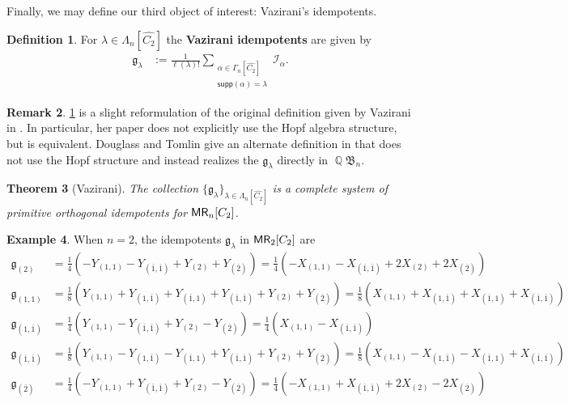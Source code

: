 \documentclass[11pt, oneside, reqno]{amsart}
\newtheorem{theorem}{Theorem}[section]
\theoremstyle{definition}
\newtheorem{definition}[theorem]{Definition}
\newtheorem{example}[theorem]{Example}
\newtheorem{remark}[theorem]{Remark}
\numberwithin{equation}{section}
\DeclareMathOperator{\Q}{\mathbb{Q}}
\newcommand{\defn}[1]{{\color{RoyalBlue}\bf#1}}
\def \MR {{\sf{MR}}}
\def \frakg{{\mathfrak{g}}}
\def \ol{\overline}
\def \I {{\mathcal{I}}}
\def \ztwo {{C_2}}
\def \ztwodual {{\widehat{\ztwo}}}
\def \ztwocompositiondual{{\Gamma_n[\ztwodual]}}
\def \ztwopartitiondual{{\Lambda_n[\ztwodual]}}
\def \supp{\mathsf{supp}}
\begin{document}
Finally, we may define our third object of interest:  Vazirani's idempotents.
\begin{definition} \label{def:vazidem}
For $\lambda \in \ztwopartitiondual$ the \defn{Vazirani idempotents} are given by 
\begin{align*}
     \frakg_{\lambda} &:= \frac{1}{\ell( \lambda) !} \sum_{\substack{\alpha \in \ztwocompositiondual\\ \supp(\alpha) = \lambda}} \I_\alpha.
    \end{align*}
\end{definition}
\begin{remark}
\cref{def:vazidem} is a slight reformulation of the original definition given by Vazirani in \cite{vazirani}. In particular, her paper does not explicitly use the Hopf algebra structure, but is equivalent. Douglass and Tomlin give an alternate definition in \cite{DouTom2018decomposition} that does not use the Hopf structure and instead realizes the $\frakg_{\lambda}$ directly in $\Q \mathfrak{B}_n $.
\end{remark}
\begin{theorem}[Vazirani]
    The collection $\{\frakg_{\lambda}\}_{\lambda \in \ztwopartitiondual}$ is a complete system of primitive orthogonal idempotents for $\MR_n[\ztwo]$.
\end{theorem}
\begin{example} 
When $n=2$, the idempotents $\frakg_{\lambda}$ in $\MR_2[\ztwo]$ are
\begin{align*}
    \frakg_{(2)} & 
        = \frac{1}{4} \left( -Y_{(1,1)}  - Y_{(\ol{1},\ol{1})} + Y_{(2)} + Y_{(\ol{2})}\right) 
        = \frac{1}{4} \left( -X_{(1,1)}  - X_{(\ol{1},\ol{1})} + 2X_{(2)} + 2X_{(\ol{2})}\right)\\
    \frakg_{(1,1)} &
        = \frac{1}{8} \left( Y_{(1,1)} + Y_{(1, \ol{1})} + Y_{(\ol{1}, 1)} + Y_{(\ol{1},\ol{1})} + Y_{(2)} + Y_{(\ol{2})} \right) 
        =\frac{1}{8} \left( X_{(1,1)} + X_{(1, \ol{1})} + X_{(\ol{1}, 1)} + X_{(\ol{1},\ol{1})}\right)  \\
    \frakg_{(1, \ol{1})} &
        = \frac{1}{4} \left( Y_{(1,1)} - Y_{(\ol{1},\ol{1})} + Y_{(2)} - Y_{(\ol{2})} \right) 
        = \frac{1}{4} \left( X_{(1,1)} - X_{(\ol{1},\ol{1})}\right)  \\
    \frakg_{(\ol{1},\ol{1})} &
        = \frac{1}{8} \left( Y_{(1,1)} - Y_{(1, \ol{1})} - Y_{(\ol{1}, 1)} + Y_{(\ol{1},\ol{1})} + Y_{(2)} + Y_{(\ol{2})} \right) 
        = \frac{1}{8} \left( X_{(1,1)} - X_{(1, \ol{1})} - X_{(\ol{1}, 1)} + X_{(\ol{1},\ol{1})}\right) \\
    \frakg_{(\ol{2})} &
        =  \frac{1}{4} \left( -Y_{(1,1)}  + Y_{(\ol{1},\ol{1})} + Y_{(2)} - Y_{(\ol{2})} \right) 
        = \frac{1}{4} \left( -X_{(1,1)}  + X_{(\ol{1},\ol{1})} + 2X_{(2)}  -2X_{(\ol{2})}\right)
\end{align*}
\end{example}
\end{document}
